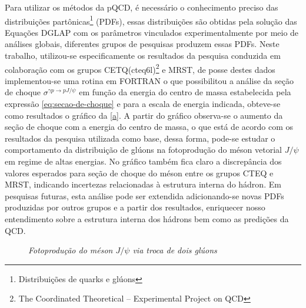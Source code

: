 \documentclass[11pt]{article}
\begin{document}
Para utilizar os métodos da pQCD, é necessário o conhecimento preciso das distribuições partônicas\footnote{Distribuições de quarks e glúons} (PDFs), essas distribuições são obtidas pela solução das Equações DGLAP com os parâmetros vinculados experimentalmente por meio de análises globais, diferentes grupos de pesquisas produzem essas PDFs. Neste trabalho, utilizou-se especificamente os resultados da pesquisa conduzida\cite{LUIS:2014} em colaboração com os grupos CETQ(cteq6l)\footnote{The Coordinated Theoretical -- Experimental Project on QCD} e MRST, de posse destes dados implementou-se uma rotina em FORTRAN o que possibilitou a análise da seção de choque $\sigma^{\gamma p\to pJ/\psi}$ em função da energia do centro de massa estabelecida pela expressão \eqref{eq:secao-de-choque} e para a escala de energia indicada, obteve-se como resultados o gráfico da \autoref{a}. A partir do gráfico observa-se o  aumento da seção de choque com a energia do centro de massa, o que está de acordo com os resultados da pesquisa utilizada como base, dessa forma, pode-se estudar o comportamento da distribuição de glúons na fotoprodução do méson vetorial $J/\psi$ em regime de altas energias. No gráfico também fica claro a discrepância dos valores esperados para seção de choque do méson entre os grupos CTEQ e MRST, indicando incertezas relacionadas à estrutura interna do hádron. Em pesquisas futuras, esta análise pode ser extendida adicionando-se novas PDFs produzidas por outros grupos e a partir dos resultados, enriquecer nosso entendimento sobre a estrutura interna dos hádrons bem como as predições da QCD.


	\begin{figure}[htb!]
		\centering
		\qquad 
		\caption{\textit{Fotoprodução do méson $J/\psi$ via troca de dois glúons}}
		\label{fig:a}
	\end{figure}
\end{document}
